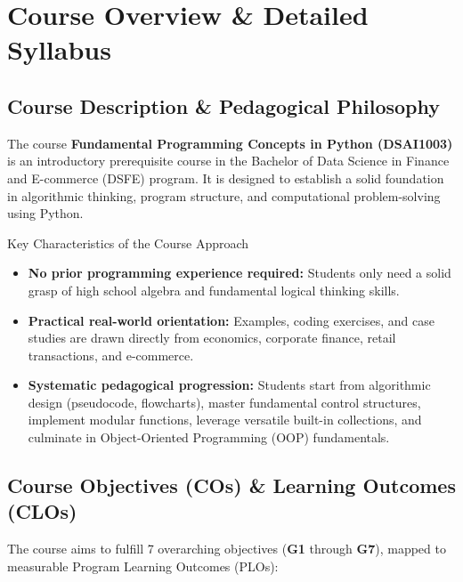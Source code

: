 \documentclass[11pt,a4paper]{article}
\begin{document}
\section{Course Overview \& Detailed Syllabus}

\subsection{Course Description \& Pedagogical Philosophy}
The course \textbf{Fundamental Programming Concepts in Python (DSAI1003)} is an introductory prerequisite course in the Bachelor of Data Science in Finance and E-commerce (DSFE) program. It is designed to establish a solid foundation in algorithmic thinking, program structure, and computational problem-solving using Python.

\begin{infobox}{Key Characteristics of the Course Approach}
\begin{itemize}[leftmargin=1.5em, itemsep=2pt]
    \item \textbf{No prior programming experience required:} Students only need a solid grasp of high school algebra and fundamental logical thinking skills.
    \item \textbf{Practical real-world orientation:} Examples, coding exercises, and case studies are drawn directly from economics, corporate finance, retail transactions, and e-commerce.
    \item \textbf{Systematic pedagogical progression:} Students start from algorithmic design (pseudocode, flowcharts), master fundamental control structures, implement modular functions, leverage versatile built-in collections, and culminate in Object-Oriented Programming (OOP) fundamentals.
\end{itemize}
\end{infobox}

\subsection{Course Objectives (COs) \& Learning Outcomes (CLOs)}
The course aims to fulfill 7 overarching objectives (\textbf{G1} through \textbf{G7}), mapped to measurable Program Learning Outcomes (PLOs):
\end{document}
